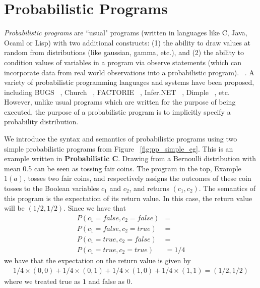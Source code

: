 \section{Probabilistic Programs}
\label{sec:pp}
\textit{Probabilistic programs} are ``usual" programs (written in languages like C, Java, Ocaml or Lisp) with two additional constructs: (1) the ability to draw values at random from distributions (like gaussian, gamma, etc.), and (2) the ability to condition values of variables in a program via observe statements (which can incorporate data from real world observations into a probabilistic program). ~\cite{gordon2014}. A variety of probabilistic programming languages and systems have been proposed, including BUGS ~\cite{bugs}, Church ~\cite{church}, FACTORIE ~\cite{factorie}, Infer.NET ~\cite{infernet}, Dimple ~\cite{dimple}, etc. However, unlike usual programs which are written for the purpose of being executed, the purpose of a probabilistic program is to implicitly specify a probability distribution. 

We introduce the syntax and semantics of probabilistic programs using two simple probabilistic programs from Figure ~\ref{fig:pp_simple_eg}. This is an example written in \textbf{Probabilistic C}. Drawing from a Bernoulli distribution with mean 0.5 can be seen as tossing fair coins. The program in the top, Example $1(a)$, tosses two fair coins, and respectively assigns the outcomes of these coin tosses to the Boolean variables $c_1$ and $c_2$, and returns $(c_1, c_2)$. The semantics of this program is the expectation of its return value. In this case, the return value will be $(1/2, 1/2)$. Since we have that 
\begin{align*}
  P( c_1 = false, c_2 = false) &=\\
  P(c_1=false, c_2=true) &= \\
  P(c_1=true, c_2=false) &= \\
  P(c_1=true, c_2=true) &= 1/4
\end{align*}
we have that the expectation on the return value is given by 
\begin{align*}
  1/4 \times (0, 0) + 1/4 \times (0, 1) + 1/4 \times (1, 0) + 1/4 \times (1, 1) = (1/2, 1/2)
\end{align*}
where we treated true as $1$ and false as $0$.

